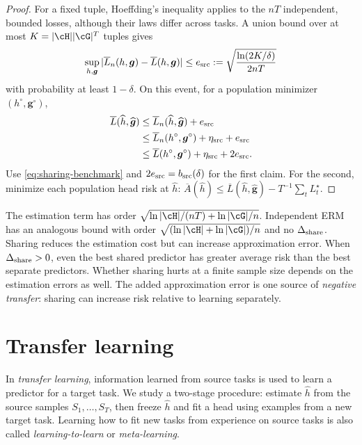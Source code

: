 \documentclass[11pt,twoside]{article}
\theoremstyle{definition}
\theoremstyle{remark}
\begin{document}
\begin{proof}
For a fixed tuple, Hoeffding's inequality applies to the $nT$ independent,
bounded losses, although their laws differ across tasks. A union bound
over at most $K=|\cH||\cG|^T$ tuples gives
\[
 \sup_{h,\boldsymbol g}
 |\overline L_n(h,\boldsymbol g)-\overline L(h,\boldsymbol g)|
 \le e_{\rm src}:=\sqrt{\frac{\ln(2K/\delta)}{2nT}}
\]
with probability at least $1-\delta$. On this event, for a population
minimizer $(h^\circ,\boldsymbol g^\circ)$,
\begin{align*}
 \overline L(\widehat h,\widehat{\boldsymbol g})
 &\le\overline L_n(\widehat h,\widehat{\boldsymbol g})+e_{\rm src}\\
 &\le\overline L_n(h^\circ,\boldsymbol g^\circ)
       +\eta_{\rm src}+e_{\rm src}\\
 &\le\overline L(h^\circ,\boldsymbol g^\circ)
       +\eta_{\rm src}+2e_{\rm src}.
\end{align*}
Use \cref{eq:sharing-benchmark} and
$2e_{\rm src}=b_{\rm src}(\delta)$ for the first
claim. For the second, minimize each population head risk at $\widehat h$:
$\overline A(\widehat h)\le
\overline L(\widehat h,\widehat{\boldsymbol g})-T^{-1}\sum_tL_t^\star$.
\end{proof}

The estimation term has order
$\sqrt{\ln|\cH|/(nT)+\ln|\cG|/n}$.
Independent ERM has an analogous bound with order
$\sqrt{(\ln|\cH|+\ln|\cG|)/n}$ and no $\Delta_{\rm share}$.
Sharing reduces the estimation cost but can increase approximation error.
When $\Delta_{\rm share}>0$, even the best shared predictor has greater
average risk than the best separate predictors. Whether sharing hurts at a
finite sample size depends on the estimation errors as well.
The added approximation error is one source of \emph{negative transfer}:
sharing can increase
risk relative to learning separately.

\section{Transfer learning}
\label{sec:transfer}

In \emph{transfer learning}, information learned from source tasks is used to
learn a predictor for a target task. We study a two-stage procedure: estimate
$\widehat h$ from the source samples $S_1,\ldots,S_T$, then freeze
$\widehat h$ and fit a head using examples from a new target task. Learning
how to fit new tasks from experience on source tasks is also called
\emph{learning-to-learn} or \emph{meta-learning}.
\end{document}

